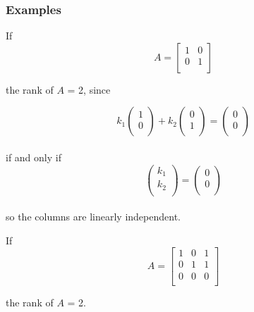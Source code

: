 \documentclass[12pt,a4paper]{article}
\theoremstyle{regla}
\theoremstyle{remark}
\theoremstyle{definition}
\theoremstyle{nonumberbreak}
\begin{document}
\subsubsection{Examples}
\begin{xmpl}

If \[A= 
  \left[ 
   \begin{array}{cc}
     1 & 0 \\
     0 & 1 \\
   \end{array}
  \right]\]

the rank of  $A$ = 2, since

 \[  k_1
  \left(
   \begin{array}{cc}
     1 \\
     0 \\
   \end{array}
  \right) +  k_2
  \left(
   \begin{array}{cc}
     0 \\
     1 \\
   \end{array}
  \right) =  \left(
    \begin{array}{cc}
      0 \\
      0 \\
    \end{array}
   \right) \] \\ if and only if  
 \[ \left( 
  \begin{array}{cc}
     k_1 \\
     k_2 \\
   \end{array}
  \right) =   \left(
    \begin{array}{cc}
      0 \\
      0 \\
    \end{array}
   \right) \] \\

so the columns are linearly independent.
\end{xmpl}

\begin{xmpl}


 If \[A = 
  \left[ 
   \begin{array}{ccc}
     1 & 0 & 1 \\
     0 & 1 & 1\\
     0 & 0 & 0 \\
   \end{array}
  \right]\]

the rank of  $A$ = 2.
\end{xmpl}
\end{document}
